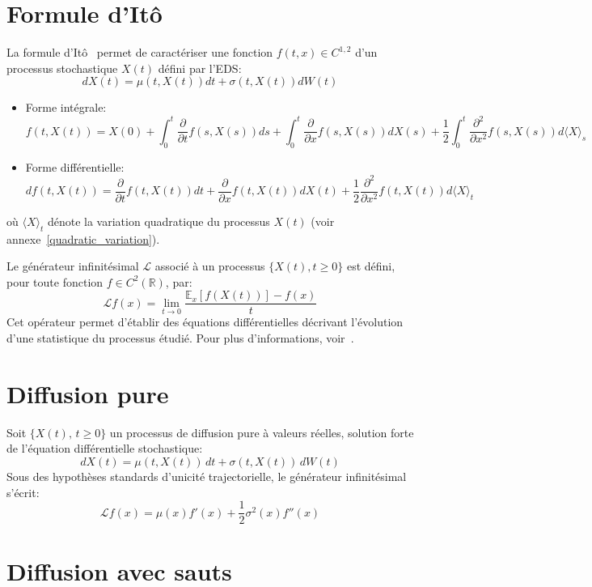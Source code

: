 \section*{Formule d'Itô}
La formule d'Itô~\cite{ito1944} permet de caractériser une fonction \(f(t,x)\in C^{1,2}\) d'un processus stochastique \(X(t)\) défini par l'\acs{EDS}:
\[
dX(t)=\mu(t,X(t))dt+\sigma(t,X(t))dW(t)
\]
\begin{itemize}
    \item Forme intégrale:
    \[
    f(t,X(t))=X(0)+\int_0^t\frac{\partial}{\partial t}f(s,X(s))ds+\int_0^t\frac{\partial}{\partial x}f(s,X(s))dX(s)+\frac{1}{2}\int_0^t\frac{\partial^2}{\partial x^2}f(s,X(s))d{\langle X\rangle}_s
    \]
    \item Forme différentielle:
    \[
    df(t,X(t))=\frac{\partial}{\partial t}f(t,X(t))dt+\frac{\partial}{\partial x}f(t,X(t))dX(t)+\frac{1}{2}\frac{\partial^2}{\partial x^2}f(t,X(t))d{\langle X\rangle}_t
    \]
\end{itemize}
où \({\langle X\rangle}_t\) dénote la variation quadratique du processus \(X(t)\) (voir annexe~\ref{quadratic_variation}).

\label{infinitesimal_generator}

Le générateur infinitésimal \( \mathcal{L} \) associé à un processus \( \{X(t), t\geq0\} \) est défini, pour toute fonction \( f \in C^2(\mathds{R}) \), par:
\[
    \mathcal{L}f(x) = \lim_{t \to 0} \frac{\mathds{E}_x[f(X(t))] - f(x)}{t}
\]
Cet opérateur permet d'établir des équations différentielles décrivant l'évolution d'une statistique du processus étudié. Pour plus d'informations, voir~\cite{bakry2014}.

\section*{Diffusion pure}

Soit \( \{X(t),\, t \geq 0\} \) un processus de diffusion pure à valeurs réelles, solution forte de l'équation différentielle stochastique:
\begin{equation}\label{diffusion_sde}
    dX(t) = \mu(t,X(t))\,dt + \sigma(t,X(t))\,dW(t)
\end{equation}
Sous des hypothèses standards d'unicité trajectorielle, le générateur infinitésimal s'écrit:
\[
    \mathcal{L}f(x) = \mu(x) f'(x) + \frac{1}{2} \sigma^2(x) f''(x)
\]

\section*{Diffusion avec sauts}

